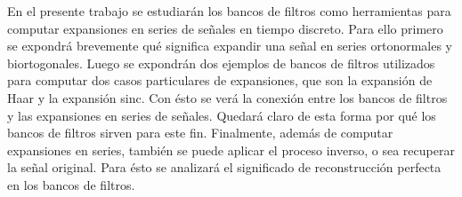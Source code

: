 
	En el presente trabajo se estudiarán los bancos de filtros como herramientas para computar expansiones en series de señales en tiempo discreto. Para ello primero se expondrá brevemente qué significa expandir una señal en series ortonormales y biortogonales. Luego se expondrán dos ejemplos de bancos de filtros utilizados para computar dos casos particulares de expansiones, que son la expansión de Haar y la expansión sinc. Con ésto se verá la conexión entre los bancos de filtros y las expansiones en series de señales. Quedará claro de esta forma por qué los bancos de filtros sirven para este fin. Finalmente, además de computar expansiones en series, también se puede aplicar el proceso inverso, o sea recuperar la señal original. Para ésto se analizará el significado de reconstrucción perfecta en los bancos de filtros.
